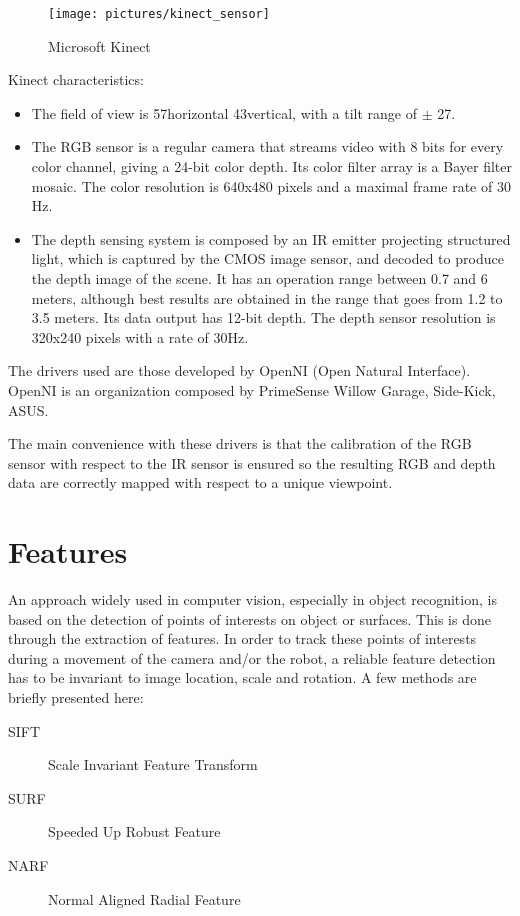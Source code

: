 \begin{figure}[h!]
\centering
\texttt{[image: pictures/kinect\_sensor]}
\caption{Microsoft Kinect}
\end{figure}

Kinect characteristics:
\begin{itemize}
\item The field of view is 57\textdegree horizontal 43\textdegree vertical, with a tilt range of $\pm$ 27\textdegree.
\item The RGB sensor is a regular camera that streams video with 8 bits for every color channel, giving a 24-bit color depth. Its color filter array is a Bayer filter mosaic. The color resolution is 640x480 pixels and a maximal frame rate of 30 Hz.
\item The depth sensing system is composed by an IR emitter projecting structured light, which is captured by the CMOS image sensor, and decoded to produce the depth image of the scene. It has an operation range between 0.7 and 6 meters, although best results are obtained in the range that goes from 1.2 to 3.5 meters. Its data output has 12-bit depth. The depth sensor resolution is 320x240 pixels with a rate of 30Hz.
\end{itemize}

The drivers used are those developed by OpenNI (Open Natural Interface). OpenNI is an organization composed by PrimeSense Willow Garage, Side-Kick, ASUS.

The main convenience with these drivers is that the calibration of the RGB sensor with respect to the IR sensor is ensured so the resulting RGB and depth data are correctly mapped with respect to a unique viewpoint.


\section{Features}

An approach widely used in computer vision, especially in object recognition, is based on the detection of points of interests on object or surfaces. This is done through the extraction of features. In order to track these points of interests during a movement of the camera and/or the robot, a reliable feature detection has to be invariant to image location, scale and rotation. A few methods are briefly presented here:
\begin{description}
\item[SIFT] Scale Invariant Feature Transform
\item[SURF] Speeded Up Robust Feature
\item[NARF] Normal Aligned Radial Feature
\end{description}

